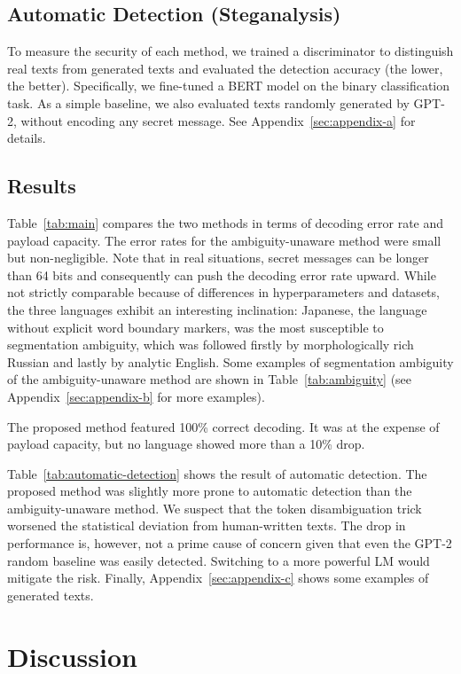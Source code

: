 \documentclass[11pt]{article}
\begin{document}
\subsection{Automatic Detection (Steganalysis)}
To measure the security of each method, we trained a discriminator to distinguish real texts from generated texts and evaluated the detection accuracy (the lower, the better).
Specifically, we fine-tuned a BERT model on the binary classification task.
As a simple baseline, we also evaluated texts randomly generated by GPT-2, without encoding any secret message.
See Appendix~\ref{sec:appendix-a}
for details.

\subsection{Results}
Table~\ref{tab:main} compares the two methods in terms of decoding error rate and payload capacity.
The error rates for the ambiguity-unaware method were small but non-negligible.
Note that in real situations, secret messages can be longer than 64 bits and consequently can push the decoding error rate upward.
While not strictly comparable because of differences in hyperparameters and datasets, the three languages exhibit an interesting inclination: Japanese, the language without explicit word boundary markers, was the most susceptible to segmentation ambiguity, which was followed firstly by morphologically rich Russian and lastly by analytic English.
Some examples of segmentation ambiguity of the ambiguity-unaware method are shown in Table~\ref{tab:ambiguity} (see Appendix~\ref{sec:appendix-b}
for more examples).

The proposed method featured 100\% correct decoding.
It was at the expense of payload capacity, but no language showed more than a 10\% drop.

Table~\ref{tab:automatic-detection} shows the result of automatic detection.
The proposed method was slightly more prone to automatic detection than the ambiguity-unaware method.
We suspect that the token disambiguation trick worsened the statistical deviation from human-written texts.
The drop in performance is, however, not a prime cause of concern given that even the GPT-2 random baseline was easily detected.
Switching to a more powerful LM would mitigate the risk.
Finally, Appendix~\ref{sec:appendix-c} shows some examples of generated texts.



\section{Discussion} \label{sec:discussion}
\end{document}
